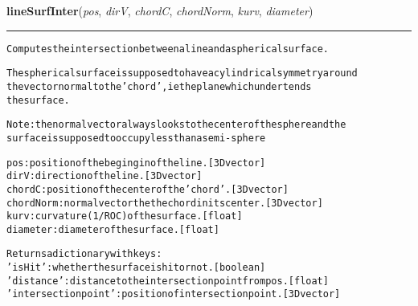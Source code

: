 \hspace{.8\funcindent}\begin{boxedminipage}{\funcwidth}

    \raggedright \textbf{lineSurfInter}(\textit{pos}, \textit{dirV}, \textit{chordC}, \textit{chordNorm}, \textit{kurv}, \textit{diameter})

    \vspace{-1.5ex}

    \rule{\textwidth}{0.5\fboxrule}
\setlength{\parskip}{2ex}
\begin{alltt}
Computes the intersection between a line and a spherical surface.

The spherical surface is supposed to have a cylindrical symmetry around
    the vector normal to the 'chord', ie the plane which undertends
    the surface.

Note: the normal vector always looks to the center of the sphere and the
    surface is supposed to occupy less than a semi-sphere

pos: position of the begingin of the line. [3D vector]
dirV: direction of the line. [3D vector]
chordC: position of the center of the 'chord'. [3D vector]
chordNorm: normal vector the the chord in its center. [3D vector]
kurv: curvature (1/ROC) of the surface. [float]
diameter: diameter of the surface. [float]

Returns a dictionary with keys:
    'is Hit': whether the surface is hit or not. [boolean]
    'distance': distance to the intersection point from pos. [float]
    'intersection point': position of intersection point. [3D vector]
\end{alltt}

\setlength{\parskip}{1ex}
    \end{boxedminipage}

    \label{theia:helpers:geometry:lineCylInter}

    \vspace{0.5ex}

